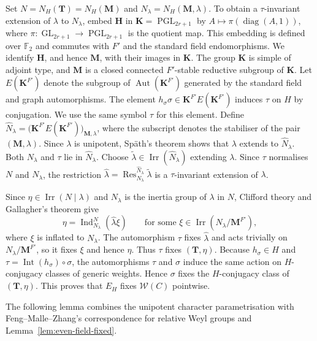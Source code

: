 \documentclass[10pt]{amsart}
\theoremstyle{definition}
\let\oldendproof\endproof
\renewenvironment{proof}[1][\proofname]{%
  \oldproof[\bfseries #1]%
}{\oldendproof}
\DeclareMathOperator{\Aut}{Aut}
\DeclareMathOperator{\Irr}{Irr}
\newcommand{\F}{\mathbb F}
\numberwithin{equation}{section}
\numberwithin{table}{section}
\begin{document}
\begin{proof}
  Set $N=N_H(\mathbf T)=N_H(\mathbf M)$ and
  $N_\lambda=N_H(\mathbf M,\lambda)$. To obtain a $\tau$-invariant
  extension of $\lambda$ to $N_\lambda$, embed $\mathbf H$ in
  $\mathbf K=\operatorname{PGL}_{2r+1}$ by
  $A\mapsto\pi(\operatorname{diag}(A,1))$, where
  $\pi\colon\operatorname{GL}_{2r+1}\to\operatorname{PGL}_{2r+1}$ is the
  quotient map.  This embedding is defined over $\F_2$ and commutes with
  $F'$ and the standard field endomorphisms.  We identify $\mathbf H$, and hence $\mathbf M$, with
  their images in $\mathbf K$.  The group $\mathbf K$ is simple of adjoint type, and
  $\mathbf M$ is a closed connected $F'$-stable reductive subgroup of
  $\mathbf K$.  Let $E(\mathbf K^{F'})$ denote the subgroup of
  $\Aut(\mathbf K^{F'})$ generated by the standard field and graph
  automorphisms.  The element
  $h_\sigma\sigma\in\mathbf K^{F'}E(\mathbf K^{F'})$ induces $\tau$ on $H$
  by conjugation.  We use the same symbol $\tau$ for this element.  Define
  $\widehat N_\lambda=
  \bigl(\mathbf K^{F'}E(\mathbf K^{F'})\bigr)_{\mathbf M,\lambda}$,
  where the subscript denotes the stabiliser of the pair
  $(\mathbf M,\lambda)$.  Since $\lambda$ is unipotent, Sp\"ath's theorem
  \cite[Theorem~3.3]{Spath2025Extensions} shows that $\lambda$ extends to
  $\widehat N_\lambda$.  Both $N_\lambda$ and $\tau$ lie in
  $\widehat N_\lambda$.  Choose
  $\widetilde\lambda\in\Irr(\widehat N_\lambda)$ extending $\lambda$.
  Since $\tau$ normalises $N$ and $N_\lambda$, the restriction
  $\widehat\lambda=\operatorname{Res}_{N_\lambda}^{\widehat N_\lambda}
  \widetilde\lambda$ is a $\tau$-invariant extension of $\lambda$.

  Since $\eta\in\Irr(N\mid\lambda)$ and $N_\lambda$ is the inertia group
  of $\lambda$ in $N$, Clifford theory and Gallagher's theorem give
  \[
    \eta=\operatorname{Ind}_{N_\lambda}^N(\widehat\lambda\xi)
    \qquad\text{for some }\xi\in\Irr(N_\lambda/\mathbf M^{F'}),
  \]
  where $\xi$ is inflated to $N_\lambda$.
  The automorphism $\tau$ fixes $\widehat\lambda$ and acts trivially on
  $N_\lambda/\mathbf M^{F'}$, so it fixes $\xi$ and hence $\eta$.
  Thus $\tau$ fixes $(\mathbf T,\eta)$.
  Because $h_\sigma\in H$ and
  $\tau=\operatorname{Int}(h_\sigma)\circ\sigma$, the automorphisms
  $\tau$ and $\sigma$ induce the same action on $H$-conjugacy classes of
  generic weights.  Hence $\sigma$ fixes the $H$-conjugacy class of
  $(\mathbf T,\eta)$.  This proves that $E_H$ fixes $\mathcal W(C)$
  pointwise.
\end{proof}

The following lemma combines the unipotent character parametrisation with
Feng--Malle--Zhang's correspondence for relative Weyl groups
\cite{FengMalleZhang2026} and Lemma~\ref{lem:even-field-fixed}.
\end{document}

